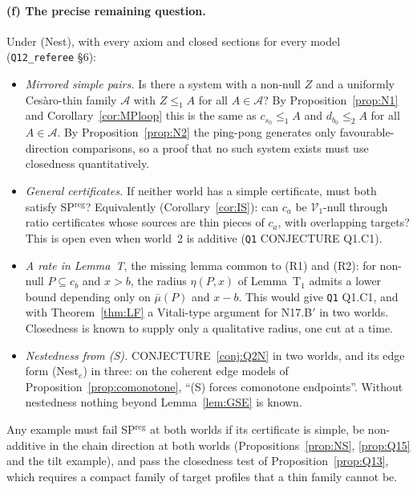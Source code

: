 \documentclass[11pt]{article}
\theoremstyle{definition}
\theoremstyle{remark}
\newcommand{\src}[1]{\texttt{#1}}
\begin{document}
\paragraph{(f) The precise remaining question.} Under (Nest), with every axiom and closed sections for every model (\src{Q12\_referee} \S6):
\begin{itemize}[leftmargin=*]
\item[\textbf{(R1)}] \emph{Mirrored simple pairs.} Is there a system with a non-null $Z$ and a uniformly Ces\`aro-thin family $\mathcal A$ with $Z\le_1A$ for all $A\in\mathcal A$? By Proposition~\ref{prop:N1} and Corollary~\ref{cor:MPloop} this is the same as $c_{s_0}\le_1A$ and $d_{b_0}\le_2A$ for all $A\in\mathcal A$. By Proposition~\ref{prop:N2} the ping-pong generates only favourable-direction comparisons, so a proof that no such system exists must use closedness quantitatively.
\item[\textbf{(R2)}] \emph{General certificates.} If neither world has a simple certificate, must both satisfy SP$^{\mathrm{reg}}$? Equivalently (Corollary~\ref{cor:IS}): can $c_a$ be $\mathcal V_1$-null through ratio certificates whose sources are thin pieces of $c_a$, with overlapping targets? This is open even when world~2 is additive (\src{Q1} CONJECTURE Q1.C1).
\item[\textbf{(R3)}] \emph{A rate in Lemma~T}, the missing lemma common to (R1) and (R2): for non-null $P\subseteq c_b$ and $x>b$, the radius $\eta(P,x)$ of Lemma~T$_1$ admits a lower bound depending only on $\bar\mu(P)$ and $x-b$. This would give \src{Q1} Q1.C1, and with Theorem~\ref{thm:LF} a Vitali-type argument for N17.B$'$ in two worlds. Closedness is known to supply only a qualitative radius, one cut at a time.
\item[\textbf{(R4)}] \emph{Nestedness from (S).} CONJECTURE~\ref{conj:Q2N} in two worlds, and its edge form (Nest$_e$) in three: on the coherent edge models of Proposition~\ref{prop:comonotone}, ``(S) forces comonotone endpoints''. Without nestedness nothing beyond Lemma~\ref{lem:GSE} is known.
\end{itemize}
Any example must fail SP$^{\mathrm{reg}}$ at both worlds if its certificate is simple, be non-additive in the chain direction at both worlds (Propositions~\ref{prop:NS}, \ref{prop:Q15} and the tilt example), and pass the closedness test of Proposition~\ref{prop:Q13}, which requires a compact family of target profiles that a thin family cannot be.
\end{document}
